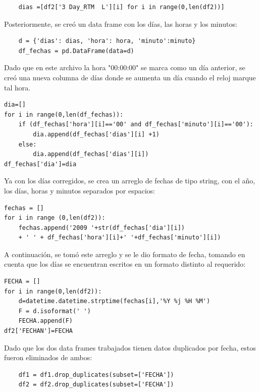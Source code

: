 \documentclass[letterpaper,12pt]{article}
\begin{document}
\begin{verbatim}
    dias =[df2['3 Day_RTM  L'][i] for i in range(0,len(df2))]
\end{verbatim}

Posteriormente, se creó un data frame con los días, las horas y los minutos:

\begin{verbatim}
    d = {'dias': dias, 'hora': hora, 'minuto':minuto}
    df_fechas = pd.DataFrame(data=d)
\end{verbatim}

Dado que en este archivo la hora "00:00:00" se marca como un día anterior, se creó una nueva columna de días donde se aumenta un día cuando el reloj marque tal hora.  

\begin{verbatim}
dia=[]
for i in range(0,len(df_fechas)):
    if (df_fechas['hora'][i]=='00' and df_fechas['minuto'][i]=='00'):
        dia.append(df_fechas['dias'][i] +1)
    else:
        dia.append(df_fechas['dias'][i])
df_fechas['dia']=dia
\end{verbatim}

Ya con los días corregidos, se crea un arreglo de fechas de tipo string, con el año, los días, horas y minutos separados por espacios:

\begin{verbatim}
fechas = []
for i in range (0,len(df2)):
    fechas.append('2009 '+str(df_fechas['dia'][i])
    + ' ' + df_fechas['hora'][i]+' '+df_fechas['minuto'][i])

\end{verbatim}

A continuación, se tomó este arreglo y se le dio formato de fecha, tomando en cuenta que los días se encuentran escritos en un formato distinto al requerido:

\begin{verbatim}
FECHA = []
for i in range(0,len(df2)):
    d=datetime.datetime.strptime(fechas[i],'%Y %j %H %M')
    F = d.isoformat(' ')
    FECHA.append(F)
df2['FECHAN']=FECHA    
\end{verbatim}

Dado que los dos data frames trabajados tienen datos duplicados por fecha, estos fueron eliminados de ambos:

\begin{verbatim}
    df1 = df1.drop_duplicates(subset=['FECHA'])
    df2 = df2.drop_duplicates(subset=['FECHA'])
\end{verbatim}
\end{document}
